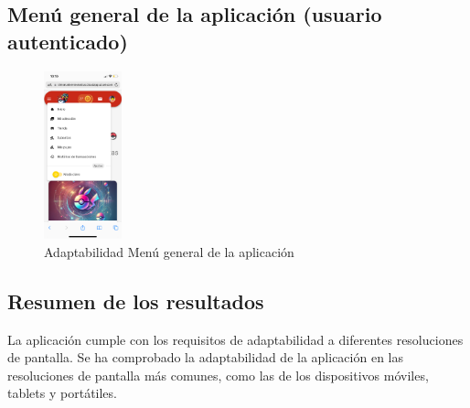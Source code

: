 \subsection*{Menú general de la aplicación (usuario autenticado)}
\begin{figure}[H]
    \centering
    \includegraphics[width=0.2\textwidth]{figures/adaptabilidad/menu.png}
    \caption{Adaptabilidad Menú general de la aplicación}
    \label{fig:Adap-Menu}
\end{figure}


\subsection*{Resumen de los resultados}
La aplicación cumple con los requisitos de adaptabilidad a diferentes resoluciones de pantalla.
Se ha comprobado la adaptabilidad de la aplicación en las resoluciones de pantalla más comunes, como las de los dispositivos móviles, tablets y portátiles.